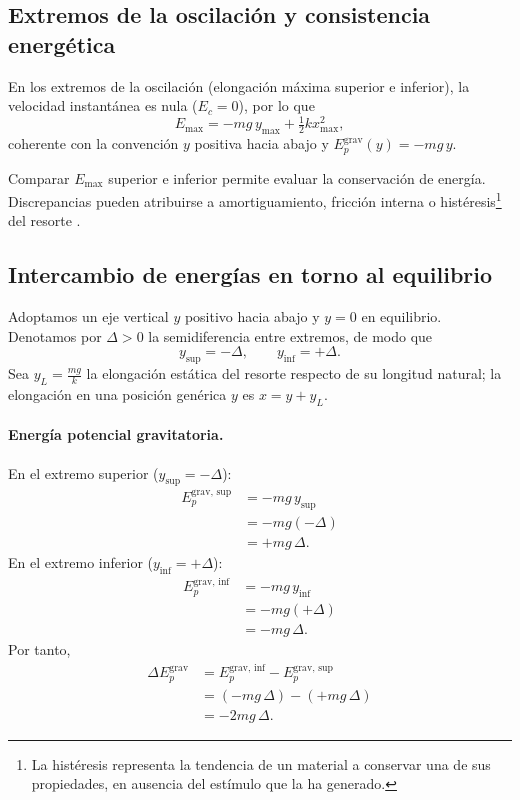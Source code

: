 \documentclass[11pt,twocolumn]{article}
\makeatletter
\let\orig@cite\cite
\renewcommand{\cite}[1]{\textcolor{Blue}{\orig@cite{#1}}}
\let\orig@parencite\parencite
\renewcommand{\parencite}[1]{\textcolor{Blue}{\orig@parencite{#1}}}
\renewcommand{\cite}[1]{\parencite{#1}}      %
\let\orig@cite\cite
\renewcommand{\cite}[1]{\textcolor{Blue}{\orig@cite{#1}}} %
\makeatother
\begin{document}
\subsection{Extremos de la oscilación y consistencia energética}

En los extremos de la oscilación (elongación máxima superior e inferior), la velocidad instantánea es nula ($E_c = 0$), por lo que
\begin{equation*}
    E_{\max} = -m g \,y_{\max} + \tfrac{1}{2}k x_{\max}^2,
\end{equation*}
coherente con la convención $y$ positiva hacia abajo y $E_p^{\text{grav}}(y)=-mg\,y$.

Comparar $E_{\max}$ superior e inferior permite evaluar la conservación de energía. Discrepancias pueden atribuirse a amortiguamiento, fricción interna o histéresis\footnote{La histéresis representa la tendencia de un material a conservar una de sus propiedades, en ausencia del estímulo que la ha generado.} del resorte \cite{MITOscilaciones}.

\subsection{Intercambio de energías en torno al equilibrio}

Adoptamos un eje vertical $y$ positivo hacia abajo y $y=0$ en equilibrio. Denotamos por $\Delta>0$ la semidiferencia entre extremos, de modo que
\begin{equation*}
    y_{\text{sup}}=-\Delta,\qquad y_{\text{inf}}=+\Delta.
\end{equation*}
Sea $y_L=\frac{mg}{k}$ la elongación estática del resorte respecto de su longitud natural; la elongación en una posición genérica $y$ es $x=y+y_L$.

\paragraph{Energía potencial gravitatoria.}
En el extremo superior ($y_{\text{sup}}=-\Delta$):
\begin{align*}
    E_p^{\text{grav, sup}}&=-mg\,y_{\text{sup}} \\[4pt]
    &=-mg(-\Delta)\\[4pt]
    &=+mg\,\Delta.
\end{align*}
En el extremo inferior ($y_{\text{inf}}=+\Delta$):
\begin{align*}
    E_p^{\text{grav, inf}}&=-mg\,y_{\text{inf}} \\[4pt]
    &=-mg(+\Delta) \\[4pt]
    &=-mg\,\Delta.
\end{align*}
Por tanto,
\begin{align*}
    \Delta E_p^{\text{grav}}
&=E_p^{\text{grav, inf}}-E_p^{\text{grav, sup}}\\[4pt]
&=(-mg\,\Delta)-(+mg\,\Delta)\\[4pt]
&=-2mg\,\Delta.
\end{align*}
\end{document}
